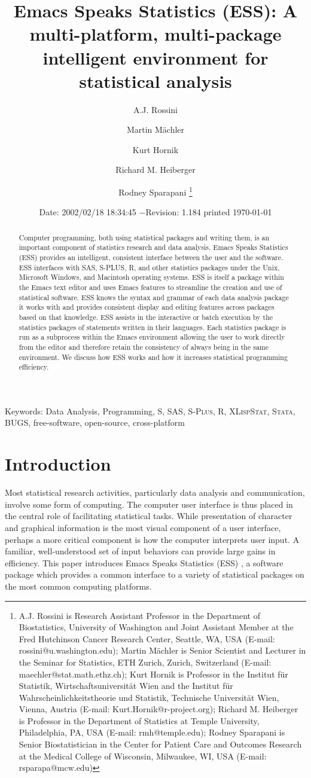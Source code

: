 \documentclass{article}
\title{Emacs Speaks Statistics (ESS): A multi-platform, multi-package
intelligent environment for statistical analysis}
\author{A.J. Rossini \and Martin M{\"a}chler \and Kurt Hornik \and Richard
  M. Heiberger \and Rodney Sparapani \footnote{%
    A.J. Rossini is Research Assistant Professor in the Department of
    Biostatistics, University of Washington and Joint Assistant Member at
    the Fred Hutchinson Cancer Research Center, Seattle, WA, USA
    (E-mail: rossini@u.washington.edu);
    Martin M{\"a}chler is Senior Scientist and Lecturer in the Seminar for
    Statistics, ETH Zurich, Zurich, Switzerland
    (E-mail: maechler@stat.math.ethz.ch);
    Kurt Hornik is Professor in the Institut f{\"u}r Statistik,
    Wirtschaftsuniversit{\"a}t Wien and the Institut f{\"u}r
    Wahrscheinlichkeitstheorie und Statistik, Technische Universit{\"a}t
    Wien, Vienna, Austria (E-mail: Kurt.Hornik@r-project.org);
    Richard M. Heiberger is Professor in the Department of Statistics at
    Temple University, Philadelphia, PA, USA (E-mail: rmh@temple.edu);
    Rodney Sparapani is Senior Biostatistician in the Center for Patient
    Care and Outcomes Research at the Medical College of Wisconsin, 
    Milwaukee, WI, USA (E-mail: rsparapa@mcw.edu)}}
\date{$ $Date: 2002/02/18 18:34:45 $ - $Revision: 1.184 $ $\tiny printed \today}
\newif\ifdraft
\renewcommand{\baselinestretch}{1.5}
\newcommand*{\SAS}{\textsc{SAS}}
\newcommand*{\Splus}{\textsc{S-Plus}}
\newcommand*{\XLispStat}{\textsc{XLispStat}}
\newcommand*{\Stata}{\textsc{Stata}}
\begin{document}

\ifdraft
\setcounter{page}{0}
\tableofcontents
\fi

\maketitle

\ifdraft{}%
\else%
 \renewcommand{\baselinestretch}{1.5}
\fi

\begin{abstract}
  Computer programming, both using statistical packages and writing
  them, is an important component of statistics research and data
  analysis.  Emacs Speaks Statistics (ESS) provides an intelligent,
  consistent interface between the user and the software.  ESS
  interfaces with SAS, S-PLUS, R, and other statistics packages under
  the Unix, Microsoft Windows, and Macintosh operating systems.  ESS
  is itself a package within the Emacs text editor and uses Emacs
  features to streamline the creation and use of statistical software.
  ESS knows the syntax and grammar of each data analysis package it
  works with and provides consistent display and editing features
  across packages based on that knowledge.  ESS assists in the
  interactive or batch execution by the statistics packages of
  statements written in their languages.  Each statistics package is
  run as a subprocess within the Emacs environment allowing the user
  to work directly from the editor and therefore retain the
  consistency of always being in the same environment.  We discuss how
  ESS works and how it increases statistical programming efficiency.
\end{abstract}

\noindent Keywords: Data Analysis, Programming, 
S, \SAS, \Splus, R, \XLispStat, \Stata, BUGS, free-software,
open-source, cross-platform

\section{Introduction}
\label{sec:introduction}

Most statistical research activities, particularly data analysis and
communication, involve some form of computing.  The computer user
interface is thus placed in the central role of facilitating
statistical tasks.  While presentation of character and graphical
information is the most visual component of a user interface,
perhaps a more critical component is how the computer interprets user
input.  A familiar, well-understood set of input behaviors can provide
large gains in efficiency.  This paper introduces Emacs Speaks
Statistics (ESS) \citep{ESS}, a software package which provides a
common interface to a variety of statistical packages on the most
common computing platforms.
\end{document}
